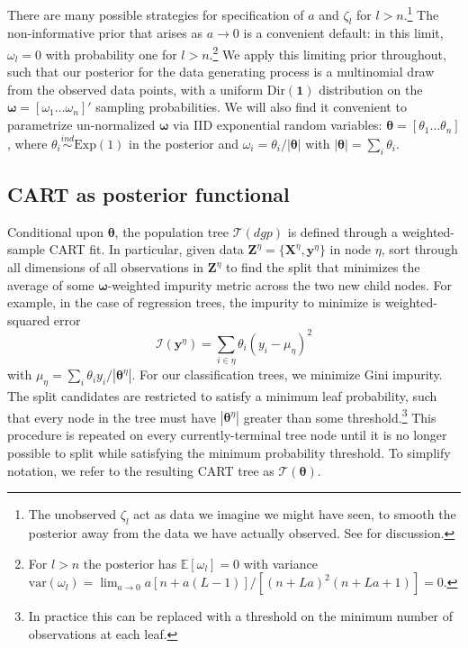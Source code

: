 \documentclass{article}
\begin{document}
There are many possible strategies for specification of $a$ and
$\zeta_l$ for $l>n$.\footnote{The unobserved $\zeta_l$ act as data we imagine we
might have seen, to smooth the posterior away from the data we have
actually observed. See \citet{poirier_bayesian_2011} for discussion.} The non-informative prior
that arises as $a\rightarrow 0$ is a convenient default: in this limit, $\omega_l = 0$ with probability one for
$l>n$.\footnote{For $l>n$ the posterior has
$\mathbb{E}[\omega_l]=0$ with variance
$\mathrm{var}(\omega_l) = \lim_{a \to 0} a[n+a(L-1)]/[(n+La)^2(n+La+1)] = 0$.}
We apply this limiting prior throughout, such that our posterior for the
data generating process is a multinomial draw from the observed
data points, with a uniform $\mathrm{Dir}(\boldsymbol{1})$ distribution
on the $\boldsymbol{\omega} = [\omega_1 \dots \omega_n]'$ sampling
probabilities.  We will also find it convenient to parametrize un-normalized $\boldsymbol{\omega}$ via
IID exponential random variables: $\boldsymbol{\theta} = [\theta_1 \dots \theta_n]$, where $\theta_i \stackrel{ind}{\sim} \mathrm{Exp}(1)$ in the posterior and $\omega_i = \theta_i/|\boldsymbol{\theta}|$ with $|\boldsymbol{\theta}| = \sum_i \theta_i$.


\subsection{CART as posterior functional}

Conditional upon $\boldsymbol{\theta}$, the population tree
$\mathcal{T}(dgp)$ is defined through a weighted-sample
CART fit. In particular, given data
$\mathbf{Z}^\eta = \{\mathbf{X}^\eta,\mathbf{y}^\eta\}$ in node $\eta$,
sort through all dimensions of all observations in $\mathbf{Z}^\eta$ to
find the split that minimizes the average of some $\boldsymbol{\omega}$-weighted
impurity metric across the two new child nodes. For example, in the case
of regression trees, the impurity to minimize is
weighted-squared error
\begin{equation}
\mathcal{I}(\mathbf{y}^\eta) = \sum_{i\in \eta} \theta_i (y_i - \mu_\eta )^2
\end{equation}
with $\mu_\eta = \sum_i \theta_i y_i/|\boldsymbol{\theta}^\eta|$.   For our
classification trees, we minimize Gini impurity.  The split candidates are
restricted to satisfy a minimum leaf probability, such that every node in the
tree must have  $|\boldsymbol{\theta}^\eta|$ greater than some
threshold.\footnote{In practice this can be replaced with a threshold on the
minimum number of observations at each leaf.}   This  procedure is repeated on
every currently-terminal tree node until it is no longer possible to split
while satisfying the minimum probability threshold. To simplify notation, we
refer to the resulting CART tree as $\mathcal{T}(\boldsymbol{\theta})$.
\end{document}
